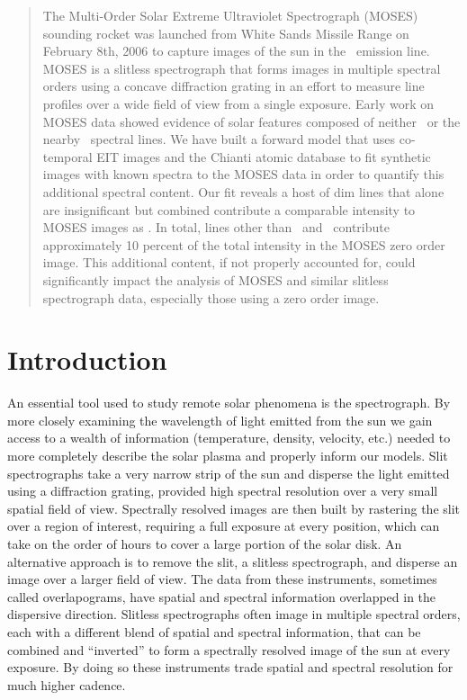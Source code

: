 \begin{abstract}
	The Multi-Order Solar Extreme Ultraviolet Spectrograph (MOSES) sounding rocket was launched from White Sands Missile Range on February 8th, 2006 to capture images of the sun in the \heii \ emission line.
	MOSES is a slitless spectrograph that forms images in multiple spectral orders using a concave diffraction grating in an effort to measure line profiles over a wide field of view from a single exposure.
	Early work on MOSES data showed evidence of solar features composed of neither \heii \ or the nearby \sixi \ spectral lines.
	We have built a forward model that uses co-temporal EIT images and the Chianti atomic database to fit synthetic images with known spectra to the MOSES data in order to quantify this additional spectral content.
	Our fit reveals a host of dim lines that alone are insignificant but combined contribute a comparable intensity to MOSES images as \sixi.
	In total, lines other than \heii\ and \sixi\ contribute approximately 10 percent of the total intensity in the MOSES zero order image.
	This additional content, if not properly accounted for, could significantly impact the analysis of MOSES and similar slitless spectrograph data, especially those using a zero order image. 
\end{abstract}



\section{Introduction}\label{sec:intro}
	
	An essential tool used to study remote solar phenomena is the spectrograph.
	By more closely examining the wavelength of light emitted from the sun we gain access to a wealth of information (temperature, density, velocity, etc.) needed to more completely describe the solar plasma and properly inform our models.
	Slit spectrographs take a very narrow strip of the sun and disperse the light emitted using a diffraction grating, provided high spectral resolution over a very small spatial field of view.
	Spectrally resolved images are then built by rastering the slit over a region of interest, requiring a full exposure at every position, which can take on the order of hours to cover a large portion of the solar disk.
	An alternative approach is to remove the slit, a slitless spectrograph, and disperse an image over a larger field of view.
	The data from these instruments, sometimes called overlapograms, have spatial and spectral information overlapped in the dispersive direction.
	Slitless spectrographs often image in multiple spectral orders, each with a different blend of spatial and spectral information, that can be combined and ``inverted'' to form a spectrally resolved image of the sun at every exposure.
	By doing so these instruments trade spatial and spectral resolution for much higher cadence.

